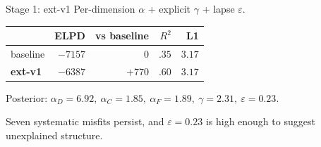 \documentclass[10pt,aspectratio=169]{beamer}
\newcommand{\main}[1]{\textcolor{CSP-main-dark}{\textbf{#1}}}
\begin{document}
\begin{frame}{Stage 1: ext-v1}
Per-dimension $\alpha$ + explicit $\gamma$ + lapse $\varepsilon$.

\vspace{0.5em}
\begin{center}
\begin{tabular}{lrrrr}
\toprule
& ELPD & vs baseline & $R^2$ & L1\\
\midrule
baseline      & $-7157$        & $0$            & $.35$        & $3.17$ \\
\main{ext-v1} & \main{$-6387$} & \main{$+770$}  & \main{$.60$} & \main{$3.17$} \\
\bottomrule
\end{tabular}
\end{center}

\vspace{0.5em}
Posterior: $\alpha_D = 6.92,\ \alpha_C = 1.85,\ \alpha_F = 1.89,\ \gamma = 2.31,\ \varepsilon = 0.23$.

\vspace{0.5em}
Seven systematic misfits persist, and $\varepsilon = 0.23$ is high enough to suggest unexplained structure.
\end{frame}
\end{document}
